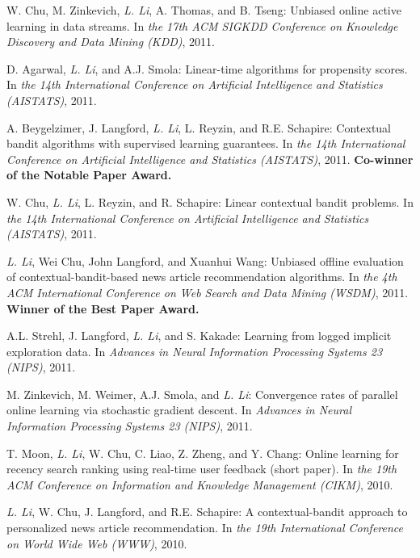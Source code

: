\documentclass[10pt,twoside,letterpaper]{article}
\newcommand{\selffont}[1]{{\textit{#1}}}
\newcommand{\venuefont}[1]{{\textit{#1}}}
\newcommand{\myself}{\selffont{L. Li}}
\begin{document}
\begin{compactenum}[(C1)]
\item{W. Chu, M. Zinkevich, \myself, A. Thomas, and B. Tseng: Unbiased online active learning in data streams.  In \venuefont{the 17th ACM SIGKDD Conference on Knowledge Discovery and Data Mining (KDD)}, 2011.}

\item{D. Agarwal, \myself, and A.J. Smola: Linear-time algorithms for propensity scores.  In \venuefont{the 14th International Conference on Artificial Intelligence and Statistics (AISTATS)}, 2011.}

\item{A. Beygelzimer, J. Langford, \myself, L. Reyzin, and R.E. Schapire: Contextual bandit algorithms with supervised learning guarantees.  In \venuefont{the 14th International Conference on Artificial Intelligence and Statistics (AISTATS)}, 2011.  \textbf{Co-winner of the Notable Paper Award.}}

\item{W. Chu, \myself, L. Reyzin, and R. Schapire: Linear contextual bandit problems.  In \venuefont{the 14th International Conference on Artificial Intelligence and Statistics (AISTATS)}, 2011.}

\item{\myself, Wei Chu, John Langford, and Xuanhui Wang: Unbiased offline evaluation of contextual-bandit-based news article recommendation algorithms.  In \venuefont{the 4th ACM International Conference on Web Search and Data Mining (WSDM)}, 2011.  \textbf{Winner of the Best Paper Award.}}

\item{A.L. Strehl, J. Langford, \myself, and S. Kakade: Learning from logged implicit exploration data.  In \venuefont{Advances in Neural Information Processing Systems 23 (NIPS)}, 2011.}

\item{M. Zinkevich, M. Weimer, A.J. Smola, and \myself: Convergence rates of parallel online learning via stochastic gradient descent.  In \venuefont{Advances in Neural Information Processing Systems 23 (NIPS)}, 2011.}

\item{T. Moon, \myself, W. Chu, C. Liao, Z. Zheng, and Y. Chang:  Online learning for recency search ranking using real-time user feedback (short paper).  In \venuefont{the 19th ACM Conference on Information and Knowledge Management (CIKM)}, 2010.}

\item{\myself, W. Chu, J. Langford, and R.E. Schapire: A contextual-bandit approach to personalized news article recommendation.  In \venuefont{the 19th International Conference on World Wide Web (WWW)}, 2010.}


\end{compactenum}
\end{document}
